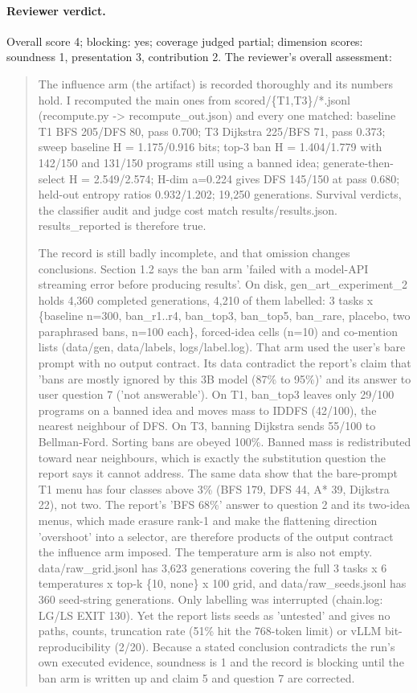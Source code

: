\documentclass[11pt,letterpaper]{article}
\begin{document}
\paragraph{Reviewer verdict.}

Overall score 4; blocking: yes; coverage judged partial; dimension scores: soundness 1, presentation 3, contribution 2. The reviewer's overall assessment:

\begin{quote}\small

The influence arm (the artifact) is recorded thoroughly and its numbers hold. I recomputed the main ones from scored/\{T1,T3\}/*.jsonl (recompute.py -\textgreater{} recompute\_out.json) and every one matched: baseline T1 BFS 205/DFS 80, pass 0.700; T3 Dijkstra 225/BFS 71, pass 0.373; sweep baseline H = 1.175/0.916 bits; top-3 ban H = 1.404/1.779 with 142/150 and 131/150 programs still using a banned idea; generate-then-select H = 2.549/2.574; H-dim a=0.224 gives DFS 145/150 at pass 0.680; held-out entropy ratios 0.932/1.202; 19,250 generations. Survival verdicts, the classifier audit and judge cost match results/results.json. results\_reported is therefore true.

The record is still badly incomplete, and that omission changes conclusions. Section 1.2 says the ban arm 'failed with a model-API streaming error before producing results'. On disk, gen\_art\_experiment\_2 holds 4,360 completed generations, 4,210 of them labelled: 3 tasks x \{baseline n=300, ban\_r1..r4, ban\_top3, ban\_top5, ban\_rare, placebo, two paraphrased bans, n=100 each\}, forced-idea cells (n=10) and co-mention lists (data/gen, data/labels, logs/label.log). That arm used the user's bare prompt with no output contract. Its data contradict the report's claim that 'bans are mostly ignored by this 3B model (87\% to 95\%)' and its answer to user question 7 ('not answerable'). On T1, ban\_top3 leaves only 29/100 programs on a banned idea and moves mass to IDDFS (42/100), the nearest neighbour of DFS. On T3, banning Dijkstra sends 55/100 to Bellman-Ford. Sorting bans are obeyed 100\%. Banned mass is redistributed toward near neighbours, which is exactly the substitution question the report says it cannot address. The same data show that the bare-prompt T1 menu has four classes above 3\% (BFS 179, DFS 44, A* 39, Dijkstra 22), not two. The report's 'BFS 68\%' answer to question 2 and its two-idea menus, which made erasure rank-1 and make the flattening direction 'overshoot' into a selector, are therefore products of the output contract the influence arm imposed. The temperature arm is also not empty. data/raw\_grid.jsonl has 3,623 generations covering the full 3 tasks x 6 temperatures x top-k \{10, none\} x 100 grid, and data/raw\_seeds.jsonl has 360 seed-string generations. Only labelling was interrupted (chain.log: LG/LS EXIT 130). Yet the report lists seeds as 'untested' and gives no paths, counts, truncation rate (51\% hit the 768-token limit) or vLLM bit-reproducibility (2/20). Because a stated conclusion contradicts the run's own executed evidence, soundness is 1 and the record is blocking until the ban arm is written up and claim 5 and question 7 are corrected.


\end{quote}
\end{document}
